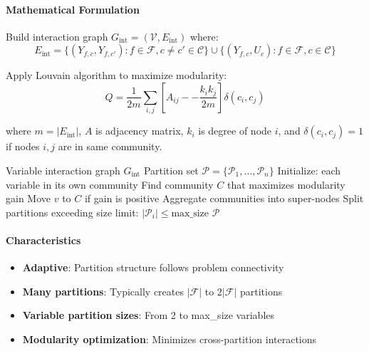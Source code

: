\documentclass{oqireport}
\begin{document}
\paragraph{Mathematical Formulation}

Build interaction graph $G_{\text{int}} = (\mathcal{V}, E_{\text{int}})$ where:
\begin{equation}
E_{\text{int}} = \{(Y_{f,c}, Y_{f,c'}) : f \in \mathcal{F}, c \neq c' \in \mathcal{C}\} \cup \{(Y_{f,c}, U_c) : f \in \mathcal{F}, c \in \mathcal{C}\}
\end{equation}

Apply Louvain algorithm to maximize modularity:
\begin{equation}
Q = \frac{1}{2m} \sum_{i,j} \left[ A_{ij} -- \frac{k_i k_j}{2m} \right] \delta(c_i, c_j)
\end{equation}

where $m = |E_{\text{int}}|$, $A$ is adjacency matrix, $k_i$ is degree of node $i$, and $\delta(c_i, c_j) = 1$ if nodes $i,j$ are in same community.

\begin{algorithm}
\caption{Louvain Community Detection Decomposition}
\begin{algorithmic}[1]
\Require Variable interaction graph $G_{\text{int}}$
\Ensure Partition set $\mathcal{P} = \{\mathcal{P}_1, \ldots, \mathcal{P}_n\}$
\State Initialize: each variable in its own community
\Repeat
        \State Find community $C$ that maximizes modularity gain
        \State Move $v$ to $C$ if gain is positive
    \EndFor
    \State Aggregate communities into super-nodes
\State Split partitions exceeding size limit: $|\mathcal{P}_i| \leq \text{max\_size}$
\State \Return $\mathcal{P}$
\end{algorithmic}
\end{algorithm}

\paragraph{Characteristics}
\begin{itemize}
\item \textbf{Adaptive}: Partition structure follows problem connectivity
\item \textbf{Many partitions}: Typically creates $|\mathcal{F}|$ to $2|\mathcal{F}|$ partitions
\item \textbf{Variable partition sizes}: From 2 to max\_size variables
\item \textbf{Modularity optimization}: Minimizes cross-partition interactions
\end{itemize}
\end{document}
